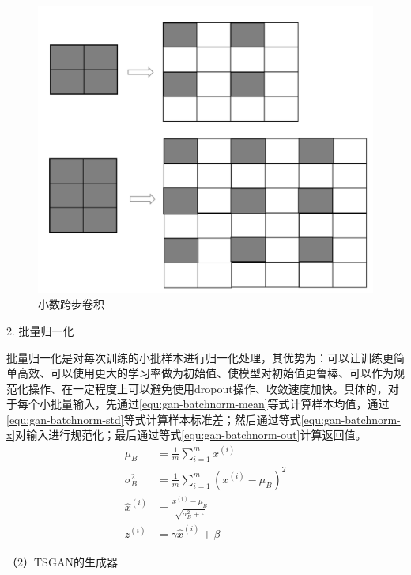 \begin{figure}[H]
\centering
\includegraphics[scale=0.5]{figures/gan-unpooling.png}
\caption{小数跨步卷积}
\label{fig:gan-unpooling}
\end{figure}

2. 批量归一化

批量归一化是对每次训练的小批样本进行归一化处理，其优势为：可以让训练更简单高效、可以使用更大的学习率做为初始值、使模型对初始值更鲁棒、可以作为规范化操作、在一定程度上可以避免使用dropout操作、收敛速度加快。具体的，对于每个小批量输入，先通过\ref{equ:gan-batchnorm-mean}等式计算样本均值，通过\ref{equ:gan-batchnorm-std}等式计算样本标准差；然后通过等式\ref{equ:gan-batchnorm-x}对输入进行规范化；最后通过等式\ref{equ:gan-batchnorm-out}计算返回值。
\begin{subequations}
\begin{align}
\mu_{B} &= \frac{1}{m}\sum_{i=1}^{m}x^{(i)}\label{equ:gan-batchnorm-mean}\\
\sigma_{B}^{2} &= \frac{1}{m}\sum_{i=1}^{m}(x^{(i)}-\mu_{B})^{2} \label{equ:gan-batchnorm-std}\\
\hat{x}^{(i)} &= \frac{x^{(i)}-\mu_{B}}{\sqrt{\sigma_{B}^{2}+\epsilon }} \label{equ:gan-batchnorm-x}\\
z^{(i)} &= \gamma \hat{x}^{(i)} + \beta \label{equ:gan-batchnorm-out}
\end{align}
\end{subequations}

 （2）TSGAN的生成器

